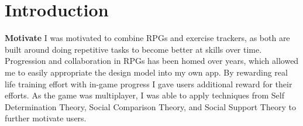 \documentclass{l4proj}
\begin{document}
%
%
%
%
%
%
%
%
\chapter{Introduction}
\textbf{Motivate} 
I was motivated to combine RPGs and exercise trackers, as both are built around doing repetitive tasks to become better at skills over time. Progression and collaboration in RPGs has been homed over years, which allowed me to easily appropriate the design model into my own app. By rewarding real life training effort with in-game progress I gave users additional reward for their efforts. As the game was multiplayer, I was able to apply techniques from Self Determination Theory, Social Comparison Theory, and Social Support Theory to further motivate users.






\end{document}
